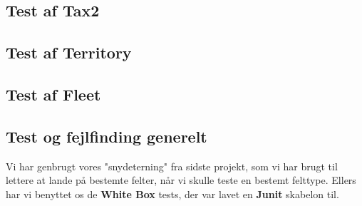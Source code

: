 \subsection{Test af Tax2}
\subsection{Test af Territory}
\subsection{Test af Fleet}
\subsection{Test og fejlfinding generelt}
Vi har genbrugt vores "snydeterning" fra sidste projekt, som vi har brugt til lettere at lande på bestemte felter, når vi skulle teste en bestemt felttype.
Ellers har vi benyttet os de \textbf{White Box} tests, der var lavet en \textbf{Junit} skabelon til.